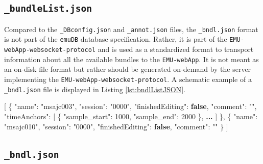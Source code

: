 \documentclass[]{book}
\newenvironment{Shaded}{\begin{snugshade}}{\end{snugshade}}
\newcommand{\DataTypeTok}[1]{\textcolor[rgb]{0.13,0.29,0.53}{#1}}
\newcommand{\DecValTok}[1]{\textcolor[rgb]{0.00,0.00,0.81}{#1}}
\newcommand{\ErrorTok}[1]{\textcolor[rgb]{0.64,0.00,0.00}{\textbf{#1}}}
\newcommand{\FunctionTok}[1]{\textcolor[rgb]{0.00,0.00,0.00}{#1}}
\newcommand{\KeywordTok}[1]{\textcolor[rgb]{0.13,0.29,0.53}{\textbf{#1}}}
\newcommand{\OtherTok}[1]{\textcolor[rgb]{0.56,0.35,0.01}{#1}}
\newcommand{\StringTok}[1]{\textcolor[rgb]{0.31,0.60,0.02}{#1}}
\begin{document}
\hypertarget{subsec:app-chapExampleFilesBundleList}{%
\subsection{\texorpdfstring{\texttt{\_bundleList.json}}{\_bundleList.json}}\label{subsec:app-chapExampleFilesBundleList}}

Compared to the \texttt{\_DBconfig.json} and \texttt{\_annot.json} files, the \texttt{\_bndl.json} format is not part of the \texttt{emuDB} database specification. Rather, it is part of the \texttt{EMU-webApp-websocket-protocol} and is used as a standardized format to transport information about all the available bundles to the \texttt{EMU-webApp}. It is not meant as an on-disk file format but rather should be generated on-demand by the server implementing the \texttt{EMU-webApp-websocket-protocol}. A schematic example of a \texttt{\_bndl.json} file is displayed in Listing \ref{lst:bndlListJSON}.

\begin{Shaded}
\begin{Highlighting}[]
\OtherTok{[}
  \FunctionTok{\{}
  \DataTypeTok{"name"}\FunctionTok{:} \StringTok{"msajc003"}\FunctionTok{,}
  \DataTypeTok{"session"}\FunctionTok{:} \StringTok{"0000"}\FunctionTok{,}
  \DataTypeTok{"finishedEditing"}\FunctionTok{:} \KeywordTok{false}\FunctionTok{,}
  \DataTypeTok{"comment"}\FunctionTok{:} \StringTok{""}\FunctionTok{,}
  \DataTypeTok{"timeAnchors"}\FunctionTok{:} \OtherTok{[}
    \FunctionTok{\{}
      \DataTypeTok{"sample_start"}\FunctionTok{:} \DecValTok{1000}\FunctionTok{,}
      \DataTypeTok{"sample_end"}\FunctionTok{:} \DecValTok{2000}
    \FunctionTok{\}}\OtherTok{,} \ErrorTok{...}
  \OtherTok{]}
  \FunctionTok{\}}\OtherTok{,}
  \FunctionTok{\{}
  \DataTypeTok{"name"}\FunctionTok{:} \StringTok{"msajc010"}\FunctionTok{,}
  \DataTypeTok{"session"}\FunctionTok{:} \StringTok{"0000"}\FunctionTok{,}
  \DataTypeTok{"finishedEditing"}\FunctionTok{:} \KeywordTok{false}\FunctionTok{,}
  \DataTypeTok{"comment"}\FunctionTok{:} \StringTok{""}
  \FunctionTok{\}}
\OtherTok{]}
\end{Highlighting}
\end{Shaded}

\hypertarget{subsec:app-chapExampleFilesBndlJSON}{%
\subsection{\texorpdfstring{\texttt{\_bndl.json}}{\_bndl.json}}\label{subsec:app-chapExampleFilesBndlJSON}}
\end{document}
